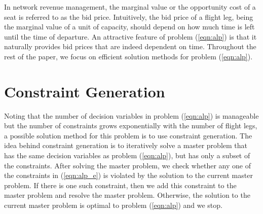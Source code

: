 In network revenue management, the marginal value or the opportunity cost of a seat is referred to as the bid price. Intuitively, the bid price of a flight leg, being the marginal value of a unit of capacity, should depend on how much time is left until the time of departure. An attractive feature of problem (\ref{eqn:alp}) is that it naturally provides bid prices that are indeed dependent on time. Throughout the rest of the paper, we focus on efficient solution methods for problem (\ref{eqn:alp}).


\section{Constraint Generation}
\label{sec:con_gen}

Noting that the number of decision variables in problem (\ref{eqn:alp}) is manageable but the number of constraints grows exponentially with the number of flight legs, a possible solution method for this problem is to use constraint generation. The idea behind constraint generation is to iteratively solve a master problem that has the same decision variables as problem (\ref{eqn:alp}), but has only a subset of the constraints. After solving the master problem, we check whether any one of the constraints in (\ref{eqn:alp_e}) is violated by the solution to the current master problem. If there is one such constraint, then we add this constraint to the master problem and resolve the master problem. Otherwise, the solution to the current master problem is optimal to problem (\ref{eqn:alp}) and we stop.


